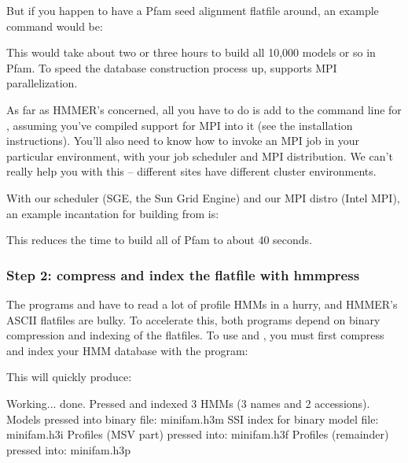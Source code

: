 But if you happen to have a Pfam seed alignment flatfile
 around, an example command would be:


This would take about two or three hours to build all 10,000 models or
so in Pfam.  To speed the database construction process up,
 supports MPI parallelization. 

As far as HMMER's concerned, all you have to do is add  to
the command line for , assuming you've compiled support
for MPI into it (see the installation instructions).  You'll also need
to know how to invoke an MPI job in your particular environment, with
your job scheduler and MPI distribution. We can't really help you with
this -- different sites have different cluster environments.

With our scheduler (SGE, the Sun Grid Engine) and our MPI distro
(Intel MPI), an example incantation for building  from
 is:


This reduces the time to build all of Pfam to about 40 seconds.

\subsubsection{Step 2: compress and index the flatfile with hmmpress}

The programs  and  have to read a lot of profile
HMMs in a hurry, and HMMER's ASCII flatfiles are bulky. To accelerate this,
both programs depend on binary compression and indexing of the flatfiles.
To use  and  , you must first compress and index
your HMM database with the  program:


This will quickly produce:

\begin{samepage}
\begin{sreoutput}
Working...    done.
Pressed and indexed 3 HMMs (3 names and 2 accessions).
Models pressed into binary file:   minifam.h3m
SSI index for binary model file:   minifam.h3i
Profiles (MSV part) pressed into:  minifam.h3f
Profiles (remainder) pressed into: minifam.h3p
\end{sreoutput}
\end{samepage}

